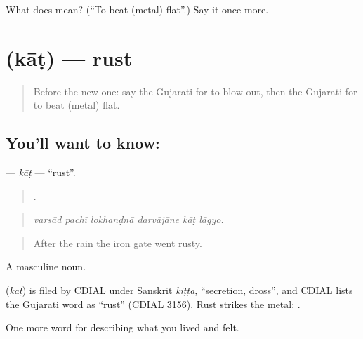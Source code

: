 \begin{tcolorbox}[breakable,colback=teal!4,colframe=teal!35!black,title={Before you move on}]
What does  mean? (\textquotedblleft{}To beat (metal) flat\textquotedblright{}.) Say it once more.
\end{tcolorbox}
\section[\texorpdfstring{\gu{કાટ} (kāṭ)}{કાટ (kāṭ)}]{ (kāṭ) — rust}

\label{lesson:GU-C509-kat}



\begin{quote}
Before the new one: say the Gujarati for to blow out, then the Gujarati for to beat (metal) flat.
\end{quote}

\subsection*{You'll want to know: }
\textbf{} — \emph{kāṭ} — \textquotedblleft{}rust\textquotedblright{}.

\begin{quote}
     .
\end{quote}

\begin{quote}
\emph{varsād pachī lokhanḍnā darvājāne kāṭ lāgyo.}
\end{quote}

\begin{quote}
After the rain the iron gate went rusty.
\end{quote}

A masculine noun.

\begin{cousinweb}
\textbf{} (\emph{kāṭ}) is filed by CDIAL under Sanskrit \emph{kiṭṭa}, \textquotedblleft{}secretion, dross\textquotedblright{}, and CDIAL lists the Gujarati word as \textquotedblleft{}rust\textquotedblright{} (CDIAL 3156). Rust strikes the metal: \textbf{  }.
\end{cousinweb}

\begin{grammarlens}[title={What you've built}]
One more word for describing what you lived and felt.
\end{grammarlens}

